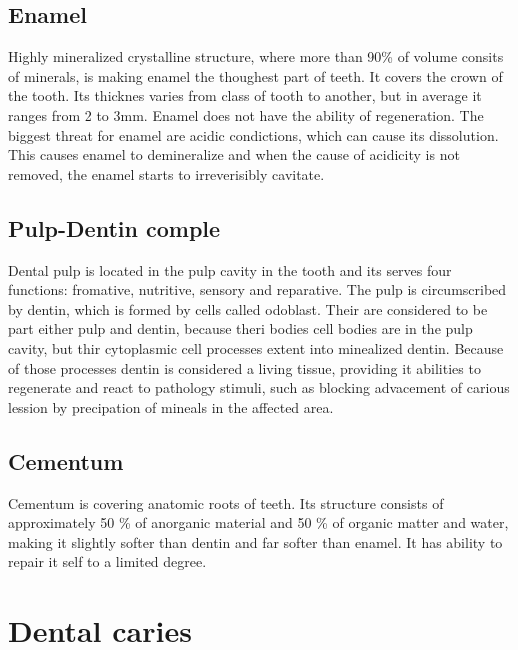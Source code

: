 \subsection*{Enamel}
Highly mineralized crystalline structure, where more than 90\% of volume consits of minerals, is making enamel the thoughest part of teeth. It covers the crown of the tooth. Its thicknes varies from class of tooth to another, but in average it ranges from 2 to 3mm. Enamel does not have the ability of regeneration. The biggest threat for enamel are acidic condictions, which can cause its dissolution. This causes enamel to demineralize and when the cause of acidicity is not removed, the enamel starts to irreverisibly cavitate.

\subsection*{Pulp-Dentin comple}
Dental pulp is located in the pulp cavity in the tooth and its serves four functions: fromative, nutritive, sensory and reparative.
The pulp is circumscribed by dentin, which is formed by cells called odoblast. Their are considered to be part either pulp and dentin, because theri bodies cell bodies are in the pulp cavity, but thir cytoplasmic cell processes extent into minealized dentin. Because of those processes dentin is considered a living tissue, providing it abilities to regenerate and react to pathology stimuli, such as blocking advacement of carious lession by precipation of mineals in the affected area.

\subsection*{Cementum}
Cementum is covering anatomic roots of teeth. Its structure consists of approximately 50 \% of anorganic material and 50 \% of organic matter and water, making it slightly softer than dentin and far softer than enamel. It has ability to repair it self to a limited degree.

\section{Dental caries}

